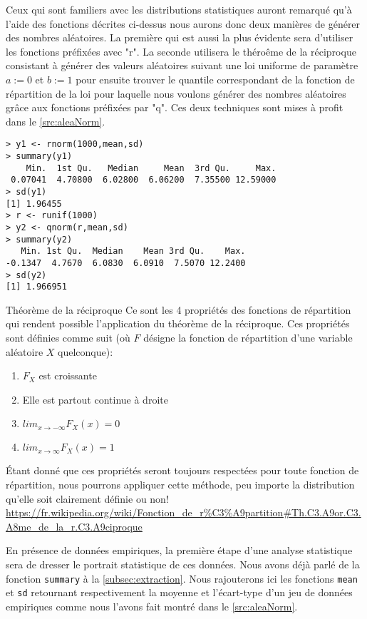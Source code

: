 Ceux qui sont familiers avec les distributions statistiques auront remarqué qu'à l'aide des fonctions décrites ci-dessus nous aurons donc deux manières de générer des nombres aléatoires. La première qui est aussi la plus évidente sera d'utiliser les fonctions préfixées avec "r". La seconde utilisera le théroême de la réciproque consistant à générer des valeurs aléatoires suivant une loi uniforme de paramètre $a := 0$ et $b := 1$ pour ensuite trouver le quantile correspondant de la fonction de répartition de la loi pour laquelle nous voulons générer des nombres aléatoires grâce aux fonctions préfixées par "q". Ces deux techniques sont mises à profit dans le \autoref{src:aleaNorm}. \\

\begin{lstlisting}[caption = Génération de nombres aléatoires,label=src:aleaNorm]
> y1 <- rnorm(1000,mean,sd)
> summary(y1)
    Min.  1st Qu.   Median     Mean  3rd Qu.     Max. 
 0.07041  4.70800  6.02800  6.06200  7.35500 12.59000 
> sd(y1)
[1] 1.96455
> r <- runif(1000)
> y2 <- qnorm(r,mean,sd)
> summary(y2)
   Min. 1st Qu.  Median    Mean 3rd Qu.    Max. 
-0.1347  4.7670  6.0830  6.0910  7.5070 12.2400 
> sd(y2)
[1] 1.966951
\end{lstlisting}

\begin{moreInfo}{Théorème de la réciproque}
	Ce sont les 4 propriétés des fonctions de répartition qui rendent possible l'application du théorème de la réciproque. Ces propriétés sont définies comme suit (où $F$ désigne la fonction de répartition d'une variable aléatoire $X$ quelconque):
	\begin{enumerate}
		\item $F_X$ est croissante
		\item Elle est partout continue à droite
		\item $lim_{x \rightarrow -\infty} F_X(x) = 0$
		\item $lim_{x \rightarrow \infty} F_X(x) = 1$
	\end{enumerate}
	Étant donné que ces propriétés seront toujours respectées pour toute fonction de répartition, nous pourrons appliquer cette méthode, peu importe la distribution qu'elle soit clairement définie ou non! \\
	\url{https://fr.wikipedia.org/wiki/Fonction_de_r%C3%A9partition#Th.C3.A9or.C3.A8me_de_la_r.C3.A9ciproque}
\end{moreInfo}

En présence de données empiriques, la première étape d'une analyse statistique sera de dresser le portrait statistique de ces données. Nous avons déjà parlé de la fonction \texttt{summary} à la \autoref{subsec:extraction}. Nous rajouterons ici les fonctions \texttt{mean} et \texttt{sd} retournant respectivement la moyenne et l'écart-type d'un jeu de données empiriques comme nous l'avons fait montré dans le \autoref{src:aleaNorm}. \\

